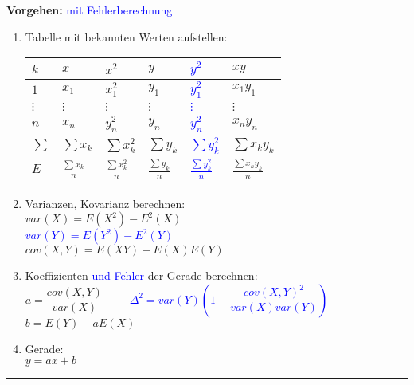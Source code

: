 \begin{minipage}[t]{10cm}
  \textbf{Vorgehen:}
  \textcolor{blue}{mit Fehlerberechnung}
	\begin{enumerate}
		\item Tabelle mit bekannten Werten aufstellen:\\
  		\begin{tabular}{|l||l|l||l|l||l|}
  		  \hline
        \textbf{$k$} & \textbf{$x$} & \textbf{$x^2$} & \textbf{$y$} &
  		  \textcolor{blue}{\textbf{$y^2$}} & \textbf{$xy$} \\
  		  \hline \hline
  		  $1$ & $x_1$ & $x_1^2$ & $y_1$ & \textcolor{blue}{$y_1^2$} & $x_1y_1$ \\
  		  \hline
  		  $\vdots$ & $\vdots$ & $\vdots$ & $\vdots$ & \textcolor{blue}{$\vdots$} &
  		  $\vdots$ \\\hline $n$ & $x_n$ & $y_n^2$ & $y_n$ & \textcolor{blue}{$y_n^2$} & $x_ny_n$ \\
  		  \hline
  		  \hline
  		  $\sum$ & $\sum x_k$ & $\sum x_k^2$ & $\sum y_k$ & \textcolor{blue}{$\sum
  		  y_k^2$} & $\sum x_ky_k$ \\
  		  \hline $E$ & $\frac{\sum x_k}{n}$ & $\frac{\sum x_k^2}{n}$ & $\frac{\sum
  		  y_k}{n}$ & \textcolor{blue}{$\frac{\sum y_k^2}{n}$} & $\frac{\sum x_ky_k}{n}$ \\
  		  \hline
  		\end{tabular} 
		\item Varianzen, Kovarianz berechnen: \\
		  $var(X) = E(X^2) - E^2(X)$ \\
		  \textcolor{blue}{$var(Y) = E(Y^2) - E^2(Y)$} \\
		  $cov(X,Y) = E(XY) - E(X)E(Y)$
		\item Koeffizienten \textcolor{blue}{und Fehler} der Gerade berechnen: \\
		  $a=\dfrac{cov(X,Y)}{var(X)}$
		  \textcolor{blue}{$\qquad\Delta^2=var(Y)\left(1-\dfrac{cov(X,Y)^2}
		  {var(X)var(Y)}\right) $} \\
		  $b=E(Y)-aE(X)$
		\item Gerade: \\
		$y=ax+b$
	\end{enumerate}
\end{minipage}

\hrule
